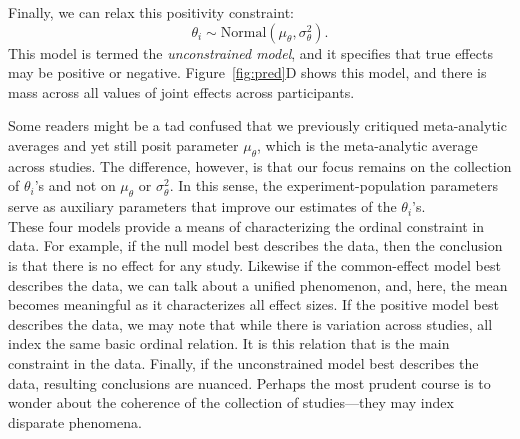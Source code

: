 \documentclass[english,man]{apa6}
\theoremstyle{definition}
\theoremstyle{definition}
\theoremstyle{remark}
\begin{document}
Finally, we can relax this positivity constraint: \[
\theta_i \sim \mbox{Normal}(\mu_\theta,\sigma^2_\theta).
\] This model is termed the \emph{unconstrained model}, and it specifies
that true effects may be positive or negative. Figure~\ref{fig:pred}D
shows this model, and there is mass across all values of joint effects
across participants.

Some readers might be a tad confused that we previously critiqued
meta-analytic averages and yet still posit parameter \(\mu_\theta\),
which is the meta-analytic average across studies. The difference,
however, is that our focus remains on the collection of \(\theta_i\)'s
and not on \(\mu_\theta\) or \(\sigma^2_\theta\). In this sense, the
experiment-population parameters serve as auxiliary parameters that
improve our estimates of the \(\theta_i\)'s.\\
These four models provide a means of characterizing the ordinal
constraint in data. For example, if the null model best describes the
data, then the conclusion is that there is no effect for any study.
Likewise if the common-effect model best describes the data, we can talk
about a unified phenomenon, and, here, the mean becomes meaningful as it
characterizes all effect sizes. If the positive model best describes the
data, we may note that while there is variation across studies, all
index the same basic ordinal relation. It is this relation that is the
main constraint in the data. Finally, if the unconstrained model best
describes the data, resulting conclusions are nuanced. Perhaps the most
prudent course is to wonder about the coherence of the collection of
studies---they may index disparate phenomena.
\end{document}
